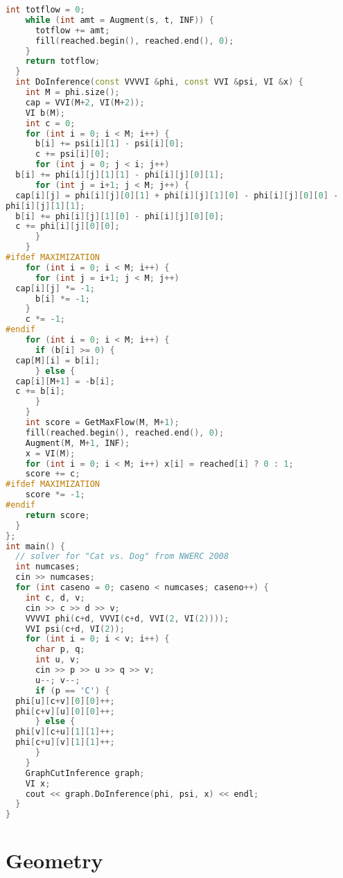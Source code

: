 \begin{lstlisting}[language=C++]
    int totflow = 0;
    while (int amt = Augment(s, t, INF)) {
      totflow += amt;
      fill(reached.begin(), reached.end(), 0);
    }
    return totflow;
  }
  int DoInference(const VVVVI &phi, const VVI &psi, VI &x) {
    int M = phi.size();
    cap = VVI(M+2, VI(M+2));
    VI b(M);
    int c = 0;
    for (int i = 0; i < M; i++) {
      b[i] += psi[i][1] - psi[i][0];
      c += psi[i][0];
      for (int j = 0; j < i; j++)
  b[i] += phi[i][j][1][1] - phi[i][j][0][1];
      for (int j = i+1; j < M; j++) {
  cap[i][j] = phi[i][j][0][1] + phi[i][j][1][0] - phi[i][j][0][0] - 
phi[i][j][1][1];
  b[i] += phi[i][j][1][0] - phi[i][j][0][0];
  c += phi[i][j][0][0];
      }
    }
#ifdef MAXIMIZATION
    for (int i = 0; i < M; i++) {
      for (int j = i+1; j < M; j++) 
  cap[i][j] *= -1;
      b[i] *= -1;
    }
    c *= -1;
#endif
    for (int i = 0; i < M; i++) {
      if (b[i] >= 0) {
  cap[M][i] = b[i];
      } else {
  cap[i][M+1] = -b[i];
  c += b[i];
      }
    }
    int score = GetMaxFlow(M, M+1);
    fill(reached.begin(), reached.end(), 0);
    Augment(M, M+1, INF);
    x = VI(M);
    for (int i = 0; i < M; i++) x[i] = reached[i] ? 0 : 1;
    score += c;
#ifdef MAXIMIZATION
    score *= -1;
#endif
    return score;
  }
};
int main() {
  // solver for "Cat vs. Dog" from NWERC 2008
  int numcases;
  cin >> numcases;
  for (int caseno = 0; caseno < numcases; caseno++) {
    int c, d, v;
    cin >> c >> d >> v;
    VVVVI phi(c+d, VVVI(c+d, VVI(2, VI(2))));
    VVI psi(c+d, VI(2));
    for (int i = 0; i < v; i++) {
      char p, q;
      int u, v;
      cin >> p >> u >> q >> v;
      u--; v--;
      if (p == 'C') {
  phi[u][c+v][0][0]++;
  phi[c+v][u][0][0]++;
      } else {
  phi[v][c+u][1][1]++;
  phi[c+u][v][1][1]++;
      }
    }
    GraphCutInference graph;
    VI x;
    cout << graph.DoInference(phi, psi, x) << endl;
  }
}
\end{lstlisting}
\section{Geometry}
